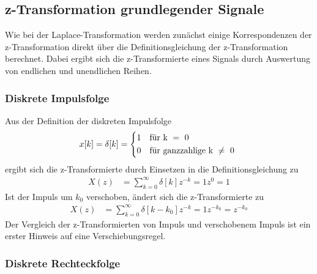 \subsection{z-Transformation grundlegender Signale}\label{sec:z-transformation-grundlegender-signale}

Wie bei der Laplace-Transformation werden zunächst einige Korrespondenzen der z-Transformation direkt über die Definitionsgleichung der z-Transformation berechnet. Dabei ergibt sich die z-Transformierte eines Signals durch Auswertung von endlichen und unendlichen Reihen.

\subsubsection{Diskrete Impulsfolge}\label{sec:diskrete-impulsfolge}

Aus der Definition der diskreten Impulsfolge
\begin{align}
x[ k] = \delta[ k] = \begin{dcases}
    1 & \text{f}\text{ü}\text{r k } = \text{ 0} \\
    0 & \text{f}\text{ü}\text{r ganzzahlige  k } \neq \text{ 0}
\end{dcases}\ \label{eq:5.9}
\end{align}
ergibt sich die z-Transformierte durch Einsetzen in die Definitionsgleichung zu
\begin{align}
X(z) &= \sum\limits_{k = 0}^{\infty}{\delta[ k]  z^{- k}} = 1  z^{0} = 1 \label{eq:5.10}
\end{align}
Ist der Impuls um \(k_{0}\) verschoben, ändert sich die z-Transformierte zu
\begin{align}
X(z) &= \sum\limits_{k = 0}^{\infty}{\delta\left[ k - k_{0} \right]  z^{- k}} = 1  z^{- k_{0}} = z^{- k_{0}} \label{eq:5.11}
\end{align}
Der Vergleich der z-Transformierten von Impuls und verschobenem Impuls ist ein erster Hinweis auf eine Verschiebungsregel.

\subsubsection{Diskrete Rechteckfolge}\label{sec:diskrete-rechteckfolge}

